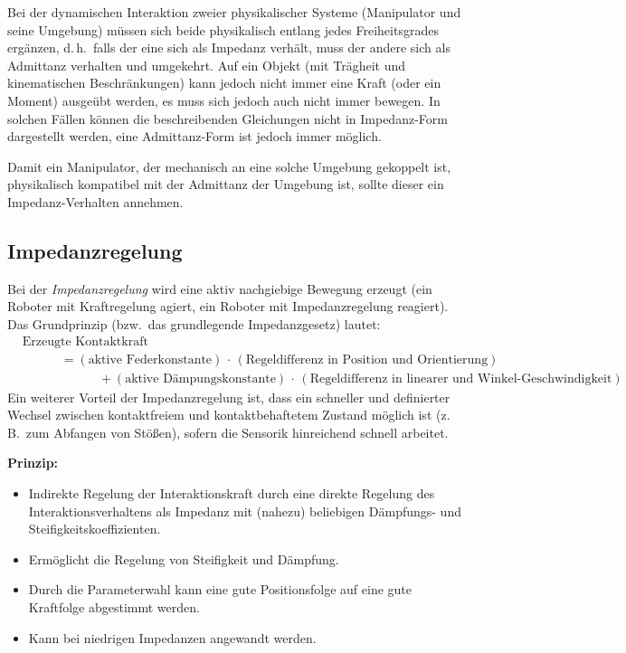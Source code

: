 \documentclass[a4paper, 11pt, accentcolor = tud3b]{tudreport}
\renewcommand{\dh}{d.\,h.~}
\newcommand{\bzw}{bzw.~}
\newcommand{\zB}{z.\,B.~}
\begin{document}
				Bei der dynamischen Interaktion zweier physikalischer Systeme (Manipulator und seine Umgebung) müssen sich beide physikalisch entlang jedes Freiheitsgrades ergänzen, \dh falls der eine sich als Impedanz verhält, muss der andere sich als Admittanz verhalten und umgekehrt. Auf ein Objekt (mit Trägheit und kinematischen Beschränkungen) kann jedoch nicht immer eine Kraft (oder ein Moment) ausgeübt werden, es muss sich jedoch auch nicht immer bewegen. In solchen Fällen können die beschreibenden Gleichungen nicht in Impedanz-Form dargestellt werden, eine Admittanz-Form ist jedoch immer möglich.
				
				Damit ein Manipulator, der mechanisch an eine solche Umgebung gekoppelt ist, physikalisch kompatibel mit der Admittanz der Umgebung ist, sollte dieser ein Impedanz-Verhalten annehmen.

			\subsection{Impedanzregelung}
				Bei der \emph{Impedanzregelung} wird eine aktiv nachgiebige Bewegung erzeugt (ein Roboter mit Kraftregelung agiert, ein Roboter mit Impedanzregelung reagiert). Das Grundprinzip (\bzw das grundlegende Impedanzgesetz) lautet:
				\begin{align*}
					&\text{Erzeugte Kontaktkraft} \\
						&\quad\quad\quad = (\text{aktive Federkonstante}) \,\cdot\, (\text{Regeldifferenz in Position und Orientierung}) \\
						&\quad\quad\quad\quad\quad\quad + (\text{aktive Dämpungskonstante}) \,\cdot\, (\text{Regeldifferenz in linearer und Winkel-Geschwindigkeit})
				\end{align*}
				Ein weiterer Vorteil der Impedanzregelung ist, dass ein schneller und definierter Wechsel zwischen kontaktfreiem und kontaktbehaftetem Zustand möglich ist (\zB zum Abfangen von Stößen), sofern die Sensorik hinreichend schnell arbeitet.
				
				\textbf{Prinzip:}
				\begin{itemize}
					\item Indirekte Regelung der Interaktionskraft durch eine direkte Regelung des Interaktionsverhaltens als Impedanz mit (nahezu) beliebigen Dämpfungs- und Steifigkeitskoeffizienten.
					\item Ermöglicht die Regelung von Steifigkeit und Dämpfung.
					\item Durch die Parameterwahl kann eine gute Positionsfolge auf eine gute Kraftfolge abgestimmt werden.
					\item Kann bei niedrigen Impedanzen angewandt werden.
				\end{itemize}
			
\end{document}
